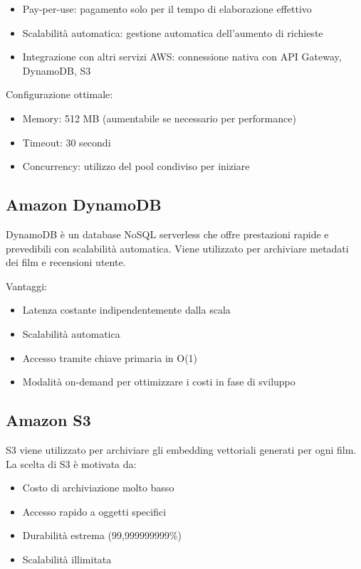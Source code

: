 \documentclass[11pt,a4paper]{article}
\begin{document}
\begin{itemize}
  \item Pay-per-use: pagamento solo per il tempo di elaborazione effettivo
  \item Scalabilità automatica: gestione automatica dell'aumento di richieste
  \item Integrazione con altri servizi AWS: connessione nativa con API Gateway, DynamoDB, S3
\end{itemize}

Configurazione ottimale:
\begin{itemize}
  \item Memory: 512 MB (aumentabile se necessario per performance)
  \item Timeout: 30 secondi
  \item Concurrency: utilizzo del pool condiviso per iniziare
\end{itemize}

\subsection{Amazon DynamoDB}
DynamoDB è un database NoSQL serverless che offre prestazioni rapide e prevedibili con scalabilità automatica. Viene utilizzato per archiviare metadati dei film e recensioni utente.

Vantaggi:
\begin{itemize}
  \item Latenza costante indipendentemente dalla scala
  \item Scalabilità automatica
  \item Accesso tramite chiave primaria in O(1)
  \item Modalità on-demand per ottimizzare i costi in fase di sviluppo
\end{itemize}

\subsection{Amazon S3}
S3 viene utilizzato per archiviare gli embedding vettoriali generati per ogni film. La scelta di S3 è motivata da:

\begin{itemize}
  \item Costo di archiviazione molto basso
  \item Accesso rapido a oggetti specifici
  \item Durabilità estrema (99,999999999\%)
  \item Scalabilità illimitata
\end{itemize}
\end{document}
